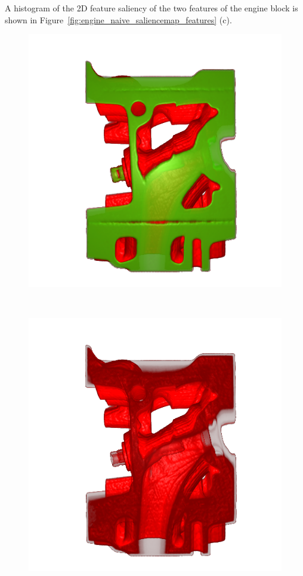 A histogram of the 2D feature saliency of the two features of the engine block is shown in Figure~\ref{fig:engine_naive_saliencemap_features} (c).

\begin{figure}
	\centering
	\begin{minipage}{.33\textwidth}
		\includegraphics[width=1\linewidth]{images/engine_naive}
	\end{minipage}~
	\begin{minipage}{.33\textwidth}
		\includegraphics[width=1\linewidth]{images/engine_naive_1}

\end{minipage}
\end{figure}
